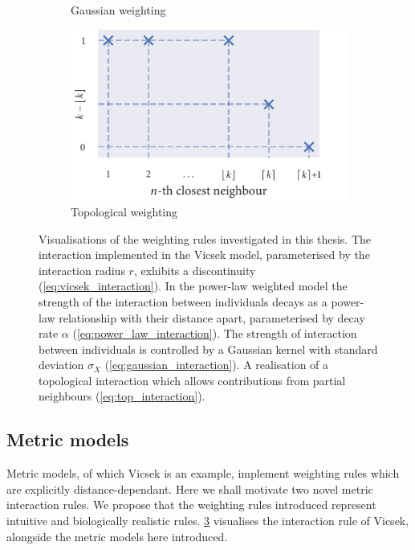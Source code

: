 \begin{figure}[tb]
\begin{subfigure}[b]{0.5\textwidth}
    \caption{Gaussian weighting}
    \label{fig:gauss_weight}
  \end{subfigure}%
  \begin{subfigure}[b]{0.5\textwidth}
    \includegraphics{topological_weighting.pdf}
    \caption{Topological weighting}
    \label{fig:top_weight}
  \end{subfigure}
  \caption{Visualisations of the weighting rules investigated in this thesis.
     The interaction implemented in the Vicsek model,
    parameterised by the interaction radius $r$, exhibits a discontinuity
    (\cref{eq:vicsek_interaction}).
     In the power-law weighted model the strength of
    the interaction between individuals decays as a power-law relationship with
    their distance apart, parameterised by decay rate $\alpha$
    (\cref{eq:power_law_interaction}).
     The
    strength of interaction between individuals is controlled by a Gaussian
    kernel with standard deviation $\sigma_X$
    (\cref{eq:gaussian_interaction}).
     A realisation of
    a topological interaction which allows contributions from partial neighbours
    (\cref{eq:top_interaction}).}
  \label{fig:weighting_rules}
\end{figure}

\subsection{Metric models}

Metric models, of which Vicsek is an example, implement weighting rules which
are explicitly distance-dependant. Here we shall motivate two novel metric
interaction rules. We propose that the weighting rules introduced represent
intuitive and biologically realistic rules. \cref{fig:weighting_rules}
visualises the interaction rule of Vicsek, alongside the metric models here
introduced.

